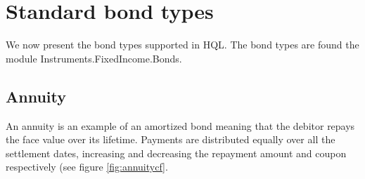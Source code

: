 \documentclass[11pt,a4paper]{article}
\numberwithin{equation}{section}
\begin{document}
	\section{Standard bond types}

	We now present the bond types supported in HQL. The bond types are found the module Instruments.FixedIncome.Bonds.



	\subsection{Annuity}

	An annuity is an example of an amortized bond meaning that the debitor repays the
	face value over its lifetime. Payments are distributed equally over all the settlement
	dates, increasing and decreasing the repayment amount and coupon respectively (see figure
	\ref{fig:annuitycf}.

\end{document}
